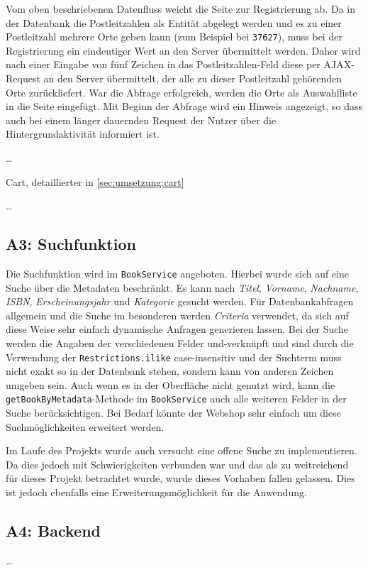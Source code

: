 		Vom oben beschriebenen Datenfluss weicht die Seite zur Registrierung ab. Da in der Datenbank die Postleitzahlen als Entität abgelegt werden und es zu einer Postleitzahl mehrere Orte geben kann (zum Beispiel bei \lstinline|37627|), muss bei der Registrierung ein eindeutiger Wert an den Server übermittelt werden. Daher wird nach einer Eingabe von fünf Zeichen in das Postleitzahlen-Feld diese per AJAX-Request an den Server übermittelt, der alle zu dieser Postleitzahl gehörenden Orte zurückliefert. War die Abfrage erfolgreich, werden die Orte als Auswahlliste in die Seite eingefügt. Mit Beginn der Abfrage wird ein Hinweis angezeigt, so dass auch bei einem länger dauernden Request der Nutzer über die Hintergrundaktivität informiert ist.
		
		\dots
		
		Cart, detaillierter in \ref{sec:umsetzung:cart}
		
		\dots

	\subsection{A3: Suchfunktion}\label{umsetzung:Suche}
	Die Suchfunktion wird im \texttt{BookService} angeboten. Hierbei wurde sich auf eine Suche über die Metadaten beschränkt. Es kann nach \textit{Titel}, \textit{Vorname}, \textit{Nachname}, \textit{ISBN}, \textit{Erscheinungsjahr} und \textit{Kategorie} gesucht werden. Für Datenbankabfragen allgemein und die Suche im besonderen werden \textit{Criteria} verwendet, da sich auf diese Weise sehr einfach dynamische Anfragen generieren lassen. Bei der Suche werden die Angaben der verschiedenen Felder und-verknüpft und sind durch die Verwendung der \texttt{Restrictions.ilike} case-insensitiv und der Suchterm muss nicht exakt so in der Datenbank stehen, sondern kann von anderen Zeichen umgeben sein.
	Auch wenn es in der Oberfläche nicht genutzt wird, kann die \texttt{getBookByMetadata}-Methode im \texttt{BookService} auch alle weiteren Felder in der Suche berücksichtigen. Bei Bedarf könnte der Webshop sehr einfach um diese Suchmöglichkeiten erweitert werden.
	
	Im Laufe des Projekts wurde auch versucht eine offene Suche zu implementieren. Da dies jedoch mit Schwierigkeiten verbunden war und das als zu weitreichend für dieses Projekt betrachtet wurde, wurde dieses Vorhaben fallen gelassen. Dies ist jedoch ebenfalls eine Erweiterungsmöglichkeit für die Anwendung.

	\subsection{A4: Backend}\label{sec:umsetzung:backend}
	\dots
